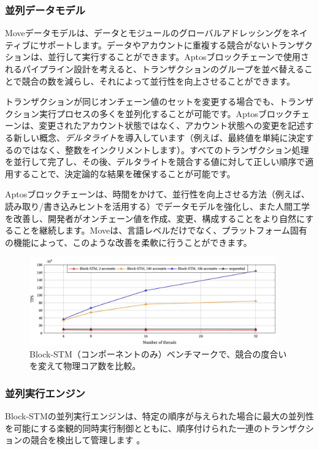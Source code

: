 \documentclass{article}
\begin{document}
\subsubsection{並列データモデル}

Moveデータモデルは、データとモジュールのグローバルアドレッシングをネイティブにサポートします。データやアカウントに重複する競合がないトランザクションは、並行して実行することができます。Aptosブロックチェーンで使用されるパイプライン設計を考えると、トランザクションのグループを並べ替えることで競合の数を減らし、それによって並行性を向上させることができます。

トランザクションが同じオンチェーン値のセットを変更する場合でも、トランザクション実行プロセスの多くを並列化することが可能です。Aptosブロックチェーンは、変更されたアカウント状態ではなく、アカウント状態への変更を記述する新しい概念、\emph{デルタライト}を導入しています（例えば、最終値を単純に決定するのではなく、整数をインクリメントします）。すべてのトランザクション処理を並行して完了し、その後、デルタライトを競合する値に対して正しい順序で適用することで、決定論的な結果を確保することが可能です。

Aptosブロックチェーンは、時間をかけて、並行性を向上させる方法（例えば、読み取り/書き込みヒントを活用する）でデータモデルを強化し、また人間工学を改善し、開発者がオンチェーン値を作成、変更、構成することをより自然にすることを継続します。Moveは、言語レベルだけでなく、プラットフォーム固有の機能によって、このような改善を柔軟に行うことができます。

\begin{figure}
\centering
\includegraphics[width=0.95\textwidth]{perf.jpg}
\caption{\label{fig:perf}Block-STM（コンポーネントのみ）ベンチマークで、競合の度合いを変えて物理コア数を比較。}
\end{figure}

\subsubsection{並列実行エンジン}

Block-STMの並列実行エンジンは、特定の順序が与えられた場合に最大の並列性を可能にする楽観的同時実行制御とともに、順序付けられた一連のトランザクションの競合を検出して管理します \cite{block_stm}。
\end{document}
